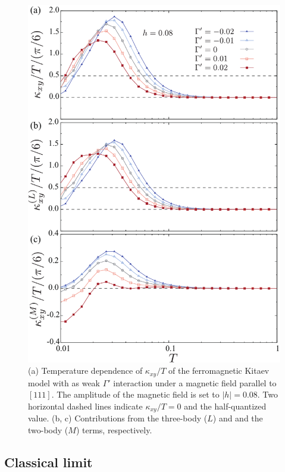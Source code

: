 \documentclass[reprint,amsmath,amssymb,aps,prx]{revtex4-2}
\begin{document}
\begin{figure}
  \begin{center}
    \includegraphics[width=0.9\linewidth]{Figs/plot_k_all_h0.08_Gp.pdf}
  \end{center}
  \caption{(a) Temperature dependence of $\kappa_{xy}/T$ of the ferromagnetic Kitaev model with as weak $\Gamma'$ interaction under a magnetic field parallel to $[111]$. The amplitude of the magnetic field is set to $|h|=0.08$. Two horizontal dashed lines indicate $\kappa_{xy}/T = 0$ and the half-quantized value. (b, c) Contributions from the three-body ($L$) and and the two-body ($M$) terms, respectively.}
  \label{fig:k_all_h0.08_Gp}
\end{figure}
 \subsection{Classical limit}
\end{document}
